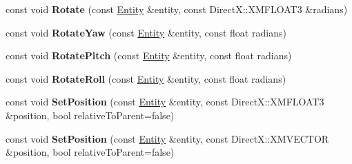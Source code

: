 \begin{DoxyCompactItemize}
\item 
const void {\bfseries Rotate} (const \hyperlink{struct_ensum_1_1_components_1_1_entity}{Entity} \&entity, const Direct\+X\+::\+X\+M\+F\+L\+O\+A\+T3 \&radians)\hypertarget{class_ensum_1_1_components_1_1_transform_manager_af12d20ba876189b13c67b8ab056993b5}{}\label{class_ensum_1_1_components_1_1_transform_manager_af12d20ba876189b13c67b8ab056993b5}

\item 
const void {\bfseries Rotate\+Yaw} (const \hyperlink{struct_ensum_1_1_components_1_1_entity}{Entity} \&entity, const float radians)\hypertarget{class_ensum_1_1_components_1_1_transform_manager_a1fca568d1223c92a34e41b0d2b02f46a}{}\label{class_ensum_1_1_components_1_1_transform_manager_a1fca568d1223c92a34e41b0d2b02f46a}

\item 
const void {\bfseries Rotate\+Pitch} (const \hyperlink{struct_ensum_1_1_components_1_1_entity}{Entity} \&entity, const float radians)\hypertarget{class_ensum_1_1_components_1_1_transform_manager_a4fe43a20b760088ab0a8eddf64d70e21}{}\label{class_ensum_1_1_components_1_1_transform_manager_a4fe43a20b760088ab0a8eddf64d70e21}

\item 
const void {\bfseries Rotate\+Roll} (const \hyperlink{struct_ensum_1_1_components_1_1_entity}{Entity} \&entity, const float radians)\hypertarget{class_ensum_1_1_components_1_1_transform_manager_ad7a14a0b253c62017263d6a92e911e10}{}\label{class_ensum_1_1_components_1_1_transform_manager_ad7a14a0b253c62017263d6a92e911e10}

\item 
const void {\bfseries Set\+Position} (const \hyperlink{struct_ensum_1_1_components_1_1_entity}{Entity} \&entity, const Direct\+X\+::\+X\+M\+F\+L\+O\+A\+T3 \&position, bool relative\+To\+Parent=false)\hypertarget{class_ensum_1_1_components_1_1_transform_manager_a401b2f17c82370f173c034d78b7fd700}{}\label{class_ensum_1_1_components_1_1_transform_manager_a401b2f17c82370f173c034d78b7fd700}

\item 
const void {\bfseries Set\+Position} (const \hyperlink{struct_ensum_1_1_components_1_1_entity}{Entity} \&entity, const Direct\+X\+::\+X\+M\+V\+E\+C\+T\+OR \&position, bool relative\+To\+Parent=false)\hypertarget{class_ensum_1_1_components_1_1_transform_manager_a1b930b81981049c5394f188baab3c1bd}{}\label{class_ensum_1_1_components_1_1_transform_manager_a1b930b81981049c5394f188baab3c1bd}


\end{DoxyCompactItemize}
